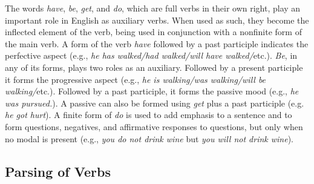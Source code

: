 \documentclass[main.tex]{subfiles}
\begin{document}

The words \textit{have}, \textit{be}, \textit{get}, and \textit{do}, which are full verbs in their own right, play an important role in English as auxiliary verbs. When used as such, they become the inflected element of the verb, being used in conjunction with a nonfinite form of the main verb. A form of the verb \textit{have} followed by a past participle indicates the perfective aspect (e.g., \textit{he has walked/had walked/will have walked/}etc.). \textit{Be}, in any of its forms, plays two roles as an auxiliary. Followed by a present participle it forms the progressive aspect (e.g., \textit{he is walking/was walking/will be walking/}etc.). Followed by a past participle, it forms the passive mood (e.g., \textit{he was pursued.}). A passive can also be formed using \textit{get} plus a past participle (e.g. \textit{he got hurt}). A finite form of \textit{do} is used to add emphasis to a sentence and to form questions, negatives, and affirmative responses to questions, but only when no modal is present (e.g., \textit{you do not drink wine} but \textit{you will not drink wine}).

\subsection{Parsing of Verbs}
\end{document}
